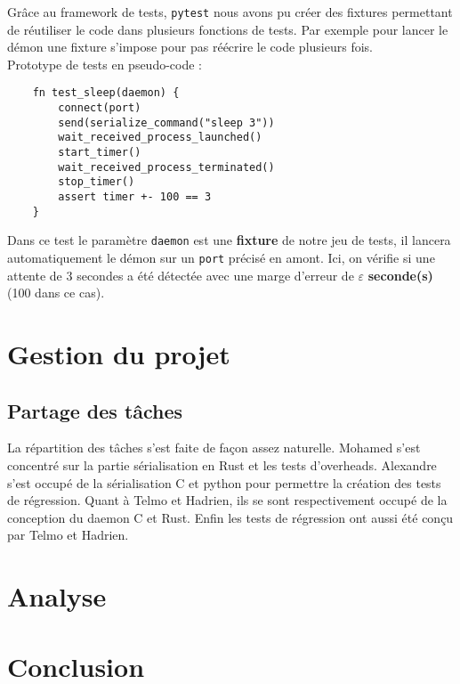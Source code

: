 \documentclass{article}
\begin{document}
Grâce au framework de tests, \texttt{pytest} nous avons pu créer des fixtures permettant de réutiliser le code dans plusieurs fonctions de tests. Par exemple pour lancer le démon une fixture s'impose pour pas réécrire le code plusieurs fois.\\

Prototype de tests en pseudo-code : 

\begin{verbatim}
    fn test_sleep(daemon) {
        connect(port)
        send(serialize_command("sleep 3"))
        wait_received_process_launched()
        start_timer()
        wait_received_process_terminated()
        stop_timer()
        assert timer +- 100 == 3
    }
\end{verbatim}

Dans ce test le paramètre \texttt{daemon} est une \textbf{fixture} de notre jeu de tests, il lancera automatiquement le démon sur un \texttt{port} précisé en amont. Ici, on vérifie si une attente de 3 secondes a été détectée avec une marge d’erreur de $\varepsilon$ \textbf{seconde(s)} (100 dans ce cas).


\section{Gestion du projet}

\subsection{Partage des tâches}

La répartition des tâches s'est faite de façon assez naturelle. Mohamed s'est concentré sur la partie sérialisation en Rust et les tests d'overheads. Alexandre s'est occupé de la sérialisation C et python pour permettre la création des tests de régression. Quant à Telmo et Hadrien, ils se sont respectivement occupé de la conception du daemon C et Rust. Enfin les tests de régression ont aussi été conçu par Telmo et Hadrien.  


\section{Analyse}
\label{sec:analyse}


\section{Conclusion}
\end{document}
